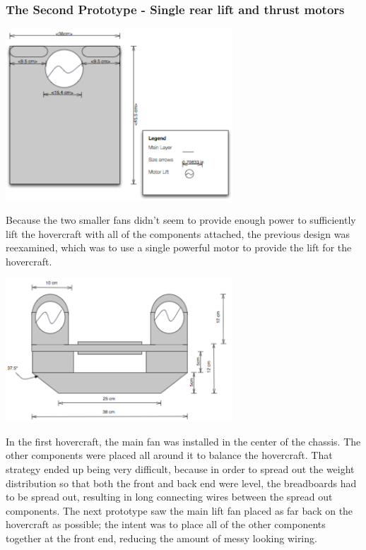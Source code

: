 \subsubsection{The Second Prototype - Single rear lift and thrust motors}

\begin{center}
  \includegraphics[width=85mm]{imageSources/Topfinal.png}
\end{center}
\label{finaltop}

Because the two smaller fans didn't seem to provide enough power to sufficiently lift the hovercraft with all of the components
attached, the previous design was reexamined, which was to use a single powerful motor to provide the lift for the hovercraft. 

\begin{center}
  \includegraphics[width=85mm]{imageSources/Frontfinal.png}
\end{center}
\label{finaltop}

In the first hovercraft, the main fan was installed in the center of the chassis.  The other components were placed all around it to 
balance the hovercraft. That strategy ended up being very difficult, because in order to spread out the weight distribution so that
both the front and back end were level, the breadboards had to be spread out, resulting in long connecting wires between the spread
out components. The next prototype saw the main lift fan placed as far back on the hovercraft as possible; the intent was to place all of the other components together at the front end, reducing the amount of messy looking wiring. 

